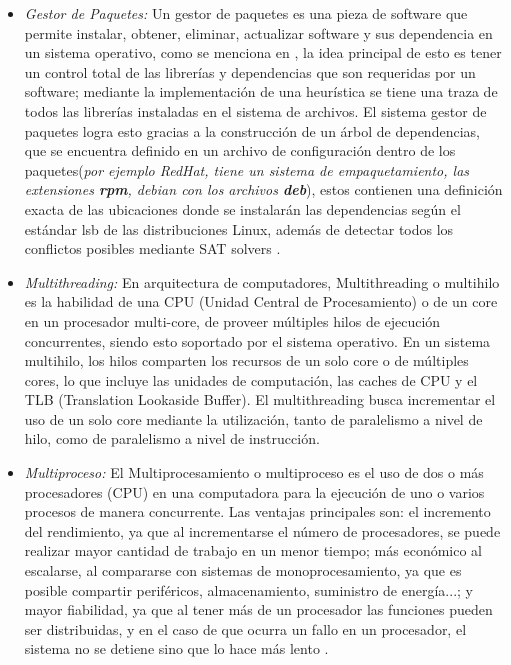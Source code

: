 \documentclass[letterpaper, 12pt, oneside]{article}
\begin{document}
    \begin{itemize}
    
       
        
        \item \textit{Gestor de Paquetes:} Un gestor de paquetes es una pieza de software que permite instalar, obtener, eliminar, actualizar software y sus dependencia en un sistema operativo, como se menciona en \cite{packagemanager}, la idea principal de esto es tener un control total de las librerías y dependencias que son requeridas por un software; mediante la implementación de una heurística se tiene una traza de todos las librerías instaladas en el sistema de archivos. El sistema gestor de paquetes logra esto gracias a la construcción de un árbol de dependencias, que se encuentra definido en un archivo de configuración dentro de los paquetes(\textit{por ejemplo RedHat, tiene un sistema de empaquetamiento, las extensiones \textbf{rpm}, debian con los archivos \textbf{deb}}), estos contienen una definición exacta de las ubicaciones donde se instalarán las dependencias según el estándar lsb de las distribuciones Linux, además de detectar todos los conflictos posibles mediante SAT solvers \cite{packagemanager}.
        
        \item \textit{Multithreading:} 
        En arquitectura de computadores, Multithreading o multihilo es la habilidad de una CPU (Unidad Central de Procesamiento) o de un core en un procesador multi-core, de proveer múltiples hilos de ejecución concurrentes, siendo esto soportado por el sistema operativo. En un sistema multihilo, los hilos comparten los recursos de un solo core o de múltiples cores, lo que incluye las unidades de computación, las caches de CPU y el TLB (Translation Lookaside Buffer)\cite{Multithreading2}.
        El multithreading busca incrementar el uso de un solo core mediante la utilización, tanto de paralelismo a nivel de hilo, como de paralelismo a nivel de instrucción\cite{Multithreading1}.


        \item \textit{Multiproceso:} El Multiprocesamiento o multiproceso es el uso de dos o más procesadores (CPU) en una computadora para la ejecución de uno o varios procesos de manera concurrente. Las ventajas principales son: el incremento del rendimiento, ya que al incrementarse el número de procesadores, se puede realizar mayor cantidad de trabajo en un menor tiempo; más económico al escalarse, al compararse con sistemas de monoprocesamiento, ya que es posible compartir periféricos, almacenamiento, suministro de energía...; y mayor fiabilidad, ya que al tener más de un procesador las funciones pueden ser distribuidas, y en el caso de que ocurra un fallo en un procesador, el sistema no se detiene sino que lo hace más lento \cite{Multiprocesamiento}. 
        

\end{itemize}
\end{document}

